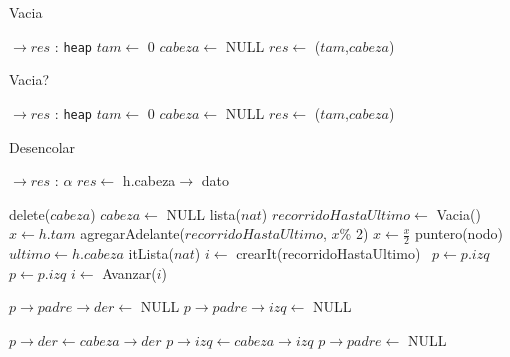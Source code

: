 \begin{Algoritmos}



\begin{algorithm}
\caption{Vacia}
\begin{algorithmic}[1]
   $\to res$ : \texttt{heap}
  \State $tam \gets$ 0
  \State $cabeza \gets$ NULL
  \State $res \gets$ ($tam$,$cabeza$)
 \EndProcedure
\end{algorithmic}
\end{algorithm}


\begin{algorithm}
\caption{Vacia?}
\begin{algorithmic}[1]
   $\to res$ : \texttt{heap}
  \State $tam \gets$ 0
  \State $cabeza \gets$ NULL
  \State $res \gets$ ($tam$,$cabeza$)
 \EndProcedure
\end{algorithmic}
\end{algorithm}



\begin{algorithm}
\caption{Desencolar}
\begin{algorithmic}[1]
   $\to res$ : $\alpha$
  \State $res \gets$ h.cabeza$\to$ dato

    \State delete($cabeza$)
    \State $cabeza \gets$ NULL
  \Else
    \State lista($nat$) $recorridoHastaUltimo \gets$ Vacia()
    \State $x \gets h.tam$
      \State agregarAdelante($recorridoHastaUltimo$, $x$\% 2)
      \State $x \gets \frac{x}{2}$
    \EndWhile
    \State puntero(nodo) $ultimo \gets h.cabeza$
    \State itLista($nat$) $i \gets$ crearIt(recorridoHastaUltimo)
       \ $p \gets p.izq$
      \Else \  $p \gets p.izq$
      \EndIf
      \State $i \gets$ Avanzar($i$)
    \EndWhile
    
      \State $p \to padre \to der \gets$ NULL
    \Else
      \State $p \to padre \to izq \gets$ NULL
    \EndIf
  
    \State $p \to der \gets cabeza \to der$
    \State $p \to izq \gets cabeza \to izq$
    \State $p \to padre \gets$ NULL
  

\end{algorithmic}
\end{algorithm}
\end{Algoritmos}

